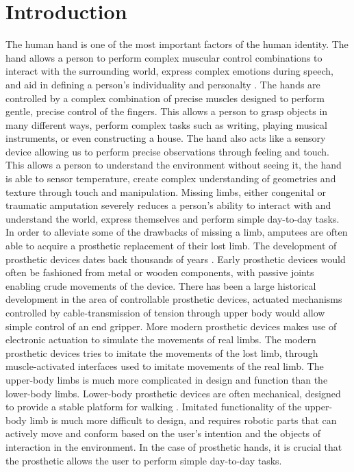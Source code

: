 \documentclass[../main.tex]{subfiles}
\begin{document}
\section{Introduction}

The human hand is one of the most important factors of the human identity.
The hand allows a person to perform complex muscular control combinations to interact with the surrounding world, express complex emotions during speech, and aid in defining a person's individuality and personalty \cite{Douglashands}.
The hands are controlled by a complex combination of precise muscles designed to perform gentle, precise control of the fingers.
This allows a person to grasp objects in many different ways, perform complex tasks such as writing, playing musical instruments, or even constructing a house.
The hand also acts like a sensory device allowing us to perform precise observations through feeling and touch.
This allows a person to understand the environment without seeing it, the hand is able to sensor temperature, create complex understanding of geometries and texture through touch and manipulation.
Missing limbs, either \gls{congenital} or \gls{traumatic} amputation severely reduces a person's ability to interact with and understand the world, express themselves and perform simple day-to-day tasks.
In order to alleviate some of the drawbacks of missing a limb, amputees are often able to acquire a prosthetic replacement of their lost limb.
The development of prosthetic devices dates back thousands of years \cite{Kevin2014}.
Early prosthetic devices would often be fashioned from metal or wooden components, with passive joints enabling crude movements of the device. 
There has been a large historical development in the area of controllable prosthetic devices, actuated mechanisms controlled by cable-transmission of tension through upper body would allow simple control of an end gripper.
More modern prosthetic devices makes use of electronic actuation to simulate the movements of real limbs.
The modern prosthetic devices tries to imitate the movements of the lost limb, through muscle-activated interfaces used to imitate movements of the real limb. 
The upper-body limbs is much more complicated in design and function than the lower-body limbs.
Lower-body prosthetic devices are often mechanical, designed to provide a stable platform for walking \cite{mechanicallegs}.
Imitated functionality of the upper-body limb is much more difficult to design, and requires robotic parts that can actively move and conform based on the user's intention and the objects of interaction in the environment.  
In the case of prosthetic hands, it is crucial that the prosthetic allows the user to perform simple day-to-day tasks.
\end{document}
